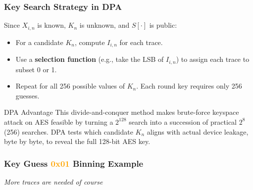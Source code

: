 \begin{frame}
    \frametitle{Key Search Strategy in DPA}

    Since $X_{i,n}$ is known, $K_n$ is unknown, and $S[\cdot]$ is public:

    \begin{itemize}
        \item For a candidate $K_n$, compute $I_{i,n}$ for each trace.
        \item Use a \textbf{selection function} (e.g., take the LSB of $I_{i,n}$) to assign each trace to subset 0 or 1.
        \item Repeat for all 256 possible values of $K_n$. Each round key requires only 256 guesses.
    \end{itemize}

\begin{block}{DPA Advantage}
        This divide-and-conquer method makes brute-force keyspace attack on AES feasible by turning a $2^{128}$ search into a succession of practical $2^8$ (256) searches. \newline
    DPA tests which candidate $K_n$ aligns with actual device leakage, byte by byte, to reveal the full 128-bit AES key.
    \end{block}
\end{frame}
\begin{frame}
    \frametitle{Key Guess \textcolor{orange}{0x01} Binning Example}
    
    \centering
     \newline \newline
        \centering \textit{More traces are needed of course}
    
    
    
\end{frame}
